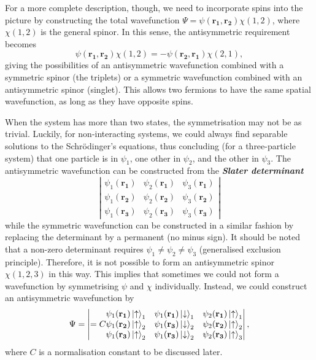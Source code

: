 \documentclass{article}
\newcommand{\up}{\ket{\uparrow}} %
\newcommand{\dn}{\ket{\downarrow}} %
\theoremstyle{nonumberplain}
\begin{document}
For a more complete description, though, we need to incorporate spins into the picture by constructing the total wavefunction $\Psi = \psi(\mathbf{r_1},\mathbf{r_2} ) \chi(1,2)$, where $\chi (1,2)$ is the general spinor. In this sense, the antisymmetric requirement becomes 
\[
    \psi (\mathbf{r_1}, \mathbf{r_2}  ) \chi (1,2) = - \psi (\mathbf{r_2}, \mathbf{r_1}  ) \chi (2,1),
\]
giving the possibilities of an antisymmetric wavefunction combined with a symmetric spinor (the triplets) or a symmetric wavefunction combined with an antisymmetric spinor (singlet). This allows two fermions to have the same spatial wavefunction, as long as they have opposite spins.  

When the system has more than two states, the symmetrisation may not be as trivial. Luckily, for non-interacting systems, we could always find separable solutions to the Schrödinger's equations, thus concluding (for a three-particle system) that one particle is in $\psi_1$, one other in $\psi_2 $, and the other in $\psi_3.$ The antisymmetric wavefunction can be constructed from the \textit{\textbf{Slater determinant}}
\[
    \left\vert  
    \begin{matrix}
        \psi_1 (\mathbf{r_1} ) & \psi_2 (\mathbf{r_1} ) & \psi_3(\mathbf{r_1} ) \\
        \psi_1 (\mathbf{r_2} ) & \psi_2 (\mathbf{r_2} ) & \psi_3(\mathbf{r_2} ) \\
        \psi_1 (\mathbf{r_3} ) & \psi_2 (\mathbf{r_3} ) & \psi_3(\mathbf{r_3} ) 
    \end{matrix} \right\vert
\] 
while the symmetric wavefunction can be constructed in a similar fashion by replacing the determinant by a permanent (no minus sign). It should be noted that a non-zero determinant requires $\psi_1 \neq \psi_2 \neq \psi_3 $ (generalised exclusion principle). Therefore, it is not possible to form an antisymmetric spinor $\chi(1,2,3)$ in this way. This implies that sometimes we could not form a wavefunction by symmetrising $\psi$ and $\chi $ individually. Instead, we could construct an antisymmetric wavefunction by 
\[\Psi = 
    \left\vert = C
    \begin{matrix}
        \psi_1(\mathbf{r_1} ) \up_1 & \psi_1(\mathbf{r_1} ) \dn_1 & \psi_2(\mathbf{r_1} ) \up_1 \\ 
        \psi_1(\mathbf{r_2} ) \up_2 & \psi_1(\mathbf{r_3} ) \dn_2 & \psi_2(\mathbf{r_2} ) \up_2 \\ 
        \psi_1(\mathbf{r_3} ) \up_2 & \psi_1(\mathbf{r_3} ) \dn_2 & \psi_2(\mathbf{r_3} ) \up_3 \\ 
    \end{matrix}
    \right\vert ,
\]
where $C$ is a normalisation constant to be discussed later. 
\end{document}
